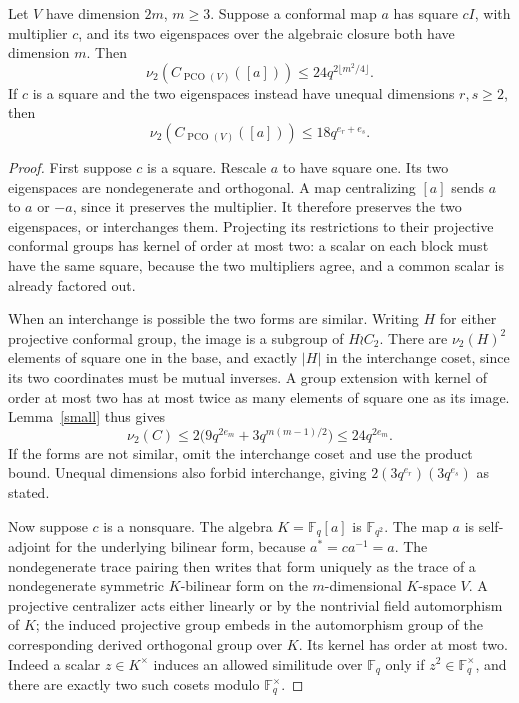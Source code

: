 \documentclass[11pt,a4paper]{article}
\newcommand{\F}{\mathbb F}\newcommand{\nuu}{\nu_2}
\newcommand{\PCO}{\operatorname{PCO}}
\begin{document}
\begin{proposition}\label{balanced}
Let $V$ have dimension $2m$, $m\ge3$. Suppose a conformal map $a$
has square $cI$, with multiplier $c$, and its two eigenspaces over the
algebraic closure both have dimension $m$. Then
\[
 \nuu(C_{\PCO(V)}([a]))\le24q^{2\lfloor m^2/4\rfloor}.
\]
If $c$ is a square and the two eigenspaces instead have unequal
dimensions $r,s\ge2$, then
\[
 \nuu(C_{\PCO(V)}([a]))\le18q^{e_r+e_s}.
\]
\end{proposition}
\begin{proof}
First suppose $c$ is a square. Rescale $a$ to have square one.
Its two eigenspaces are nondegenerate and orthogonal. A map centralizing
$[a]$ sends $a$ to $a$ or $-a$, since it preserves the multiplier.
It therefore preserves the two eigenspaces, or interchanges them.
Projecting its restrictions to their projective conformal groups has
kernel of order at most two: a scalar on each block must have the same
square, because the two multipliers agree, and a common scalar is
already factored out.

When an interchange is possible the two forms are similar. Writing
$H$ for either projective conformal group, the image is a subgroup of
$H\wr C_2$. There are $\nuu(H)^2$ elements of square one in the base,
and exactly $|H|$ in the interchange coset, since its two coordinates
must be mutual inverses. A group extension with kernel of order at
most two has at most twice as many elements of square one as its image.
Lemma~\ref{small} thus gives
\[
 \nuu(C)\le2\bigl(9q^{2e_m}+3q^{m(m-1)/2}\bigr)
 \le24q^{2e_m}.
\]
If the forms are not similar, omit the interchange coset and use the
product bound. Unequal dimensions also forbid interchange, giving
$2(3q^{e_r})(3q^{e_s})$ as stated.

Now suppose $c$ is a nonsquare. The algebra $K=\F_q[a]$ is $\F_{q^2}$.
The map $a$ is self-adjoint for the underlying bilinear form, because
$a^*=ca^{-1}=a$. The nondegenerate trace pairing then writes that form
uniquely as the trace of a nondegenerate symmetric $K$-bilinear form on
the $m$-dimensional $K$-space $V$. A projective centralizer acts either
linearly or by the nontrivial field automorphism of $K$; the induced
projective group embeds in the automorphism group of the corresponding
derived orthogonal group over $K$. Its kernel has order at most two.
Indeed a scalar $z\in K^\times$ induces an allowed similitude over
$\F_q$ only if $z^2\in\F_q^\times$, and there are exactly two such
cosets modulo $\F_q^\times$.


\end{proof}
\end{document}
